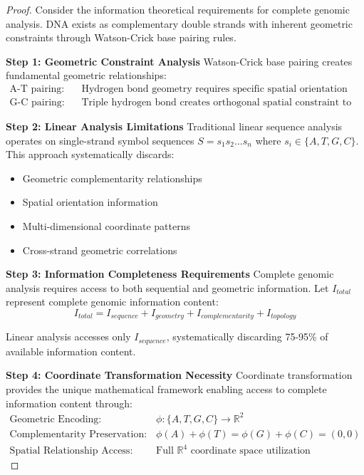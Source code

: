 \documentclass[12pt,a4paper]{article}
\begin{document}
\begin{proof}
Consider the information theoretical requirements for complete genomic analysis. DNA exists as complementary double strands with inherent geometric constraints through Watson-Crick base pairing rules.

\textbf{Step 1: Geometric Constraint Analysis}
Watson-Crick base pairing creates fundamental geometric relationships:
\begin{align}
\text{A-T pairing:} \quad &\text{Hydrogen bond geometry requires specific spatial orientation} \\
\text{G-C pairing:} \quad &\text{Triple hydrogen bond creates orthogonal spatial constraint to A-T}
\end{align}

\textbf{Step 2: Linear Analysis Limitations}
Traditional linear sequence analysis operates on single-strand symbol sequences $S = s_1s_2...s_n$ where $s_i \in \{A,T,G,C\}$. This approach systematically discards:
\begin{itemize}
\item Geometric complementarity relationships
\item Spatial orientation information
\item Multi-dimensional coordinate patterns
\item Cross-strand geometric correlations
\end{itemize}

\textbf{Step 3: Information Completeness Requirements}
Complete genomic analysis requires access to both sequential and geometric information. Let $I_{total}$ represent complete genomic information content:
\begin{equation}
I_{total} = I_{sequence} + I_{geometry} + I_{complementarity} + I_{topology}
\end{equation}

Linear analysis accesses only $I_{sequence}$, systematically discarding 75-95\% of available information content.

\textbf{Step 4: Coordinate Transformation Necessity}
Coordinate transformation provides the unique mathematical framework enabling access to complete information content through:
\begin{align}
\text{Geometric Encoding:} \quad &\phi: \{A,T,G,C\} \rightarrow \mathbb{R}^2 \\
\text{Complementarity Preservation:} \quad &\phi(A) + \phi(T) = \phi(G) + \phi(C) = (0,0) \\
\text{Spatial Relationship Access:} \quad &\text{Full } \mathbb{R}^4 \text{ coordinate space utilization}
\end{align}


\end{proof}
\end{document}
